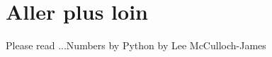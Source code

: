 \chapter[Aller plus loin]{Aller plus loin}
Please read ...Numbers by Python by Lee McCulloch-James

